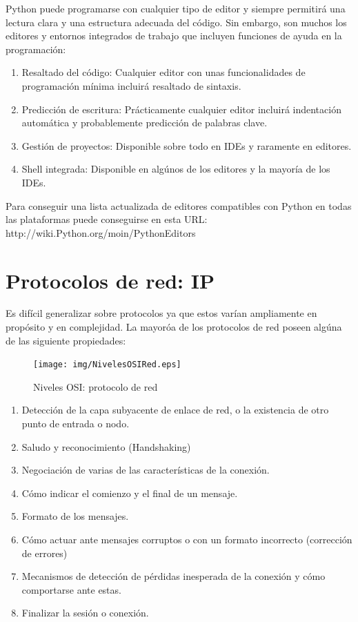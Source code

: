 \documentclass[a4paper,spanish,12pt]{book}
\begin{document}
Python puede programarse con cualquier tipo de editor y siempre permitirá una lectura clara y una estructura adecuada del código. Sin embargo, son muchos los editores y entornos integrados de trabajo que incluyen funciones de ayuda en la programación:
\begin{enumerate}
	\item{Resaltado del código: Cualquier editor con unas funcionalidades de programación mínima incluirá resaltado de sintaxis.}
	\item{Predicción de escritura: Prácticamente cualquier editor incluirá indentación automática y probablemente predicción de palabras clave.}
	\item{Gestión de proyectos: Disponible sobre todo en IDEs y raramente en editores.}
	\item{Shell integrada: Disponible en algúnos de los editores y la mayoría de los IDEs.}
\end{enumerate}

Para conseguir una lista actualizada de editores compatibles con Python en todas las plataformas puede conseguirse en esta URL: 
http://wiki.Python.org/moin/PythonEditors


\section{Protocolos de red: IP}
Es difícil generalizar sobre protocolos ya que estos varían ampliamente en propósito y en complejidad. La mayoróa de los protocolos de red poseen algúna de las siguiente propiedades:

\begin{figure}
	\texttt{[image: img/NivelesOSIRed.eps]}	
              \caption{Niveles OSI: protocolo de red}
  \label{fig:nivelesOSIRed}
\end{figure}


\begin{enumerate}
\item Detección de la capa subyacente de enlace de red, o la existencia de otro punto de entrada o nodo.
\item Saludo y reconocimiento (Handshaking)
\item Negociación de varias de las características de la conexión.
\item Cómo indicar el comienzo y el final de un mensaje.
\item Formato de los mensajes.
\item Cómo actuar ante mensajes corruptos o con un formato incorrecto (corrección de errores)
\item Mecanismos de detección de pérdidas inesperada de la conexión y cómo comportarse ante estas.
\item Finalizar la sesión o conexión.
\end{enumerate}
\end{document}
